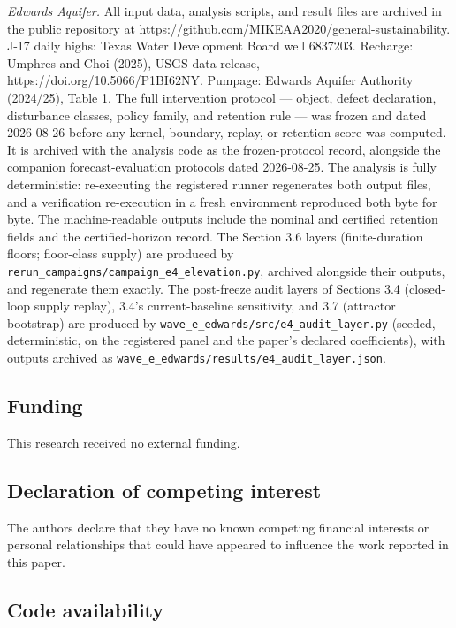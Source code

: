 \emph{Edwards Aquifer.} All input data, analysis scripts, and result files are archived in the
public repository at
https://github.com/MIKEAA2020/general-sustainability. J-17 daily highs:
Texas Water Development Board well 6837203. Recharge: Umphres and Choi
(2025), USGS data release, https://doi.org/10.5066/P1BI62NY. Pumpage:
Edwards Aquifer Authority (2024/25), Table 1. The full intervention
protocol --- object, defect declaration, disturbance classes, policy
family, and retention rule --- was frozen and dated 2026-08-26 before
any kernel, boundary, replay, or retention score was computed. It is
archived with the analysis code as the frozen-protocol record, alongside
the companion forecast-evaluation protocols dated 2026-08-25. The
analysis is fully deterministic: re-executing the registered runner
regenerates both output files, and a verification re-execution in a
fresh environment reproduced both byte for byte. The machine-readable
outputs include the nominal and certified retention fields and the
certified-horizon record. The Section 3.6 layers (finite-duration
floors; floor-class supply) are produced by
\texttt{rerun\_campaigns/campaign\_e4\_elevation.py}, archived alongside
their outputs, and regenerate them exactly. The post-freeze audit layers
of Sections 3.4 (closed-loop supply replay), 3.4's current-baseline
sensitivity, and 3.7 (attractor bootstrap) are produced by
\texttt{wave\_e\_edwards/src/e4\_audit\_layer.py} (seeded,
deterministic, on the registered panel and the paper's declared
coefficients), with outputs archived as
\texttt{wave\_e\_edwards/results/e4\_audit\_layer.json}.

\subsection*{Funding}

This research received no external funding.

\subsection*{Declaration of competing interest}

The authors declare that they have no known competing financial
interests or personal relationships that could have appeared to
influence the work reported in this paper.

\subsection*{Code availability}

